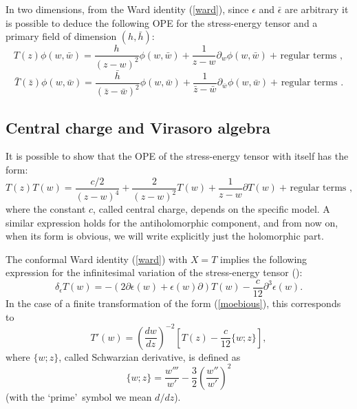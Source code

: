 \documentclass[a4paper,12pt]{report}
\begin{document}
In two dimensions, from the Ward identity (\ref{ward}), since $\epsilon$ and $\bar{\epsilon}$ are arbitrary it is
possible to deduce the following OPE for the stress-energy tensor and a primary field of dimension $(h,\bar{h})$:
\begin{equation}\label{Tprim}
T(z)\phi(w,\bar{w})=\frac{h}{(z-w)^{2}}\phi(w,\bar{w})+\frac{1}{z-w}\partial_{w}\phi(w,\bar{w})\:\textrm{+ regular
terms },
\end{equation}
\begin{equation}\label{Tbprim}
\bar{T}(\bar{z})\phi(w,\bar{w})=
\frac{\bar{h}}{(\bar{z}-\bar{w})^{2}}\phi(w,\bar{w})+\frac{1}{\bar{z}-\bar{w}}\partial_{\bar{w}}\phi(w,\bar{w})\:\textrm{+
regular terms }.
\end{equation}


\subsection{Central charge and Virasoro algebra}

It is possible to show that the OPE of the stress-energy tensor with itself has the form:
\begin{equation}\label{TT}
T(z)T(w)=\frac{c/2}{(z-w)^{4}}+\frac{2}{(z-w)^{2}}T(w)+\frac{1}{z-w}\partial T(w)\:\textrm{+ regular terms },
\end{equation}
where the constant $c$, called central charge, depends on the specific model. A similar expression holds for the
antiholomorphic component, and from now on, when its form is obvious, we will write explicitly just the
holomorphic part.

The conformal Ward identity (\ref{ward}) with $X=T$ implies the following expression for the infinitesimal
variation of the stress-energy tensor (\cite{bpz}):
\begin{equation}\label{dT}
\delta_{\epsilon}
T(w)=-\left(2\partial\epsilon(w)+\epsilon(w)\partial\right)T(w)-\frac{c}{12}\partial^{3}\epsilon(w).
\end{equation}
In the case of a finite transformation of the form (\ref{moebious}), this corresponds to
\begin{equation}\label{T'}
T'(w)=\left(\frac{dw}{dz}\right)^{-2}\left[T(z)-\frac{c}{12}\{w;z\}\right],
\end{equation}
where $\{w;z\}$, called Schwarzian derivative, is defined as
\begin{equation}\label{schw}
\{w;z\}=\frac{w'''}{w'}-\frac{3}{2}\left(\frac{w''}{w'}\right)^{2}
\end{equation}
(with the \lq prime\rq \, symbol we mean $d/dz$).
\end{document}
